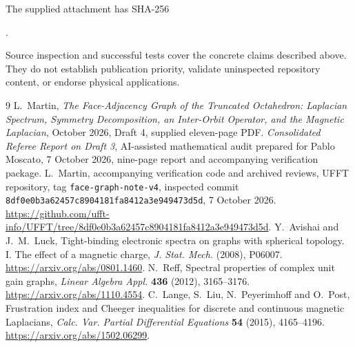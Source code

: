 \documentclass[11pt,a4paper]{article}
\begin{document}
The supplied attachment has SHA-256
\begin{center}\footnotesize
{}.
\end{center}
Source inspection and successful tests cover the concrete claims described above. They do not establish publication priority, validate uninspected repository content, or endorse physical applications.

\begin{thebibliography}{9}
 L.~Martin, \emph{The Face-Adjacency Graph of the Truncated Octahedron: Laplacian Spectrum, Symmetry Decomposition, an Inter-Orbit Operator, and the Magnetic Laplacian}, October 2026, Draft 4, supplied eleven-page PDF.
 \emph{Consolidated Referee Report on Draft 3}, AI-assisted mathematical audit prepared for Pablo Moscato, 7 October 2026, nine-page report and accompanying verification package.
 L.~Martin, accompanying verification code and archived reviews, UFFT repository, tag \texttt{face-graph-note-v4}, inspected commit \texttt{8df0e0b3a62457c8904181fa8412a3e949473d5d}, 7 October 2026. \url{https://github.com/ufft-info/UFFT/tree/8df0e0b3a62457c8904181fa8412a3e949473d5d}.
 Y.~Avishai and J.~M.~Luck, Tight-binding electronic spectra on graphs with spherical topology. I. The effect of a magnetic charge, \emph{J. Stat. Mech.} (2008), P06007. \url{https://arxiv.org/abs/0801.1460}.
 N.~Reff, Spectral properties of complex unit gain graphs, \emph{Linear Algebra Appl.} \textbf{436} (2012), 3165--3176. \url{https://arxiv.org/abs/1110.4554}.
 C.~Lange, S.~Liu, N.~Peyerimhoff and O.~Post, Frustration index and Cheeger inequalities for discrete and continuous magnetic Laplacians, \emph{Calc. Var. Partial Differential Equations} \textbf{54} (2015), 4165--4196. \url{https://arxiv.org/abs/1502.06299}.
\end{thebibliography}
\end{document}
